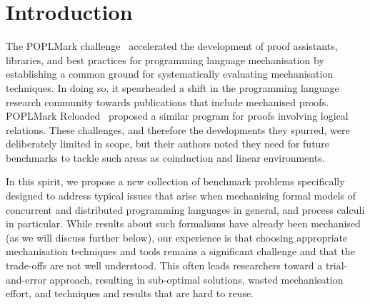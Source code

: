 \documentclass[runningheads]{llncs}
\begin{document}
\section{Introduction}
The POPLMark challenge~\cite{POPLMark} accelerated the development of proof assistants, libraries, and best practices for programming language mechanisation by establishing a common ground for systematically evaluating mechanisation techniques.
In doing so, it spearheaded a shift in the programming language research community towards publications that include mechanised proofs.
POPLMark Reloaded~\cite{POPLMarkReloaded} proposed a similar program for proofs involving logical relations.
These challenges, and therefore the developments they spurred, were deliberately limited in scope, but their authors noted they need for future benchmarks to tackle such areas as coinduction and linear environments.

In this spirit, we propose a new collection of benchmark problems specifically designed to address typical issues that arise when mechanising formal models of concurrent and distributed programming languages in general, and process calculi in particular. 
While results about such formalisms have already been mechanised (as we will discuss further below), our experience is that choosing appropriate mechanisation techniques and tools remains a significant challenge and that the trade-offs are not well understood.
This often leads researchers toward a trial-and-error approach, resulting in sub-optimal solutions, wasted mechanisation effort, and techniques and results that are hard to reuse.
\end{document}

